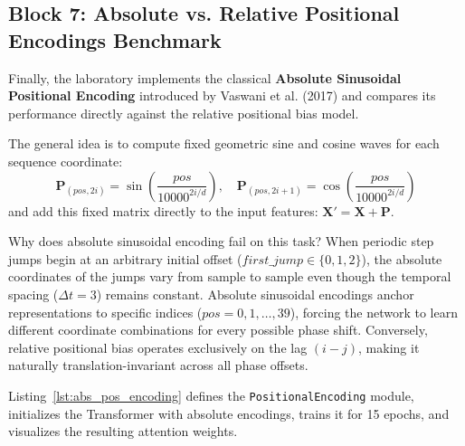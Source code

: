\documentclass[11pt,a4paper]{article}
\begin{document}
\subsection{Block 7: Absolute vs. Relative Positional Encodings Benchmark}

Finally, the laboratory implements the classical \textbf{Absolute Sinusoidal Positional Encoding} introduced by Vaswani et al. (2017) and compares its performance directly against the relative positional bias model.

The general idea is to compute fixed geometric sine and cosine waves for each sequence coordinate:
\begin{equation}
\mathbf{P}_{(pos, 2i)} = \sin\left(\frac{pos}{10000^{2i/d}}\right), \quad \mathbf{P}_{(pos, 2i+1)} = \cos\left(\frac{pos}{10000^{2i/d}}\right)
\end{equation}
and add this fixed matrix directly to the input features: $\mathbf{X}' = \mathbf{X} + \mathbf{P}$.

Why does absolute sinusoidal encoding fail on this task? When periodic step jumps begin at an arbitrary initial offset ($first\_jump \in \{0, 1, 2\}$), the absolute coordinates of the jumps vary from sample to sample even though the temporal spacing ($\Delta t = 3$) remains constant. Absolute sinusoidal encodings anchor representations to specific indices ($pos = 0, 1, \dots, 39$), forcing the network to learn different coordinate combinations for every possible phase shift. Conversely, relative positional bias operates exclusively on the lag $(i - j)$, making it naturally translation-invariant across all phase offsets.

Listing~\ref{lst:abs_pos_encoding} defines the \texttt{PositionalEncoding} module, initializes the Transformer with absolute encodings, trains it for 15 epochs, and visualizes the resulting attention weights.
\end{document}
